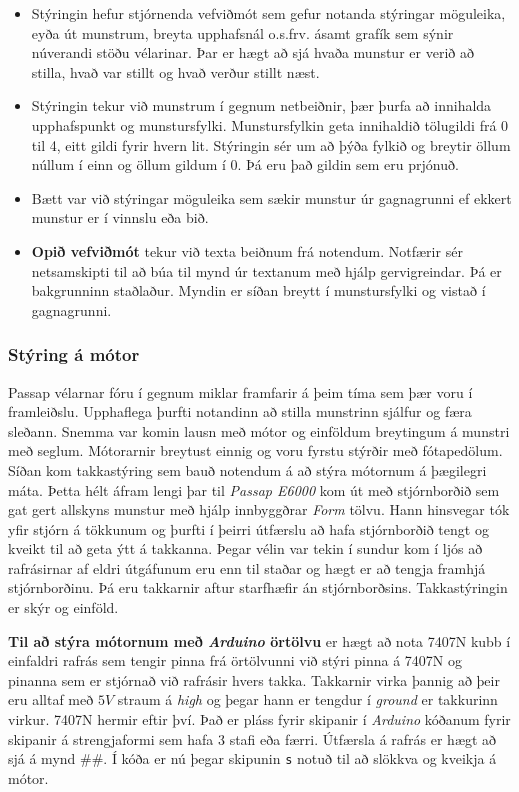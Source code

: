\begin{enumerate}
\begin{itemize}
\begin{enumerate}
        \end{enumerate}
        \item Stýringin hefur stjórnenda vefviðmót sem gefur notanda stýringar möguleika, eyða út munstrum, breyta upphafsnál o.s.frv. ásamt grafík sem sýnir núverandi stöðu vélarinar. Þar er hægt að sjá hvaða munstur er verið að stilla, hvað var stillt og hvað verður stillt næst.
        \item Stýringin tekur við munstrum í gegnum netbeiðnir, þær þurfa að innihalda upphafspunkt og munstursfylki. Munstursfylkin geta innihaldið tölugildi frá 0 til 4, eitt gildi fyrir hvern lit. Stýringin sér um að þýða fylkið og breytir öllum núllum í einn og öllum gildum í 0. Þá eru það gildin sem eru prjónuð.
        \item Bætt var við stýringar möguleika sem sækir munstur úr gagnagrunni ef ekkert munstur er í vinnslu eða bið.
        \item     \textbf{Opið vefviðmót}
    tekur við texta beiðnum frá notendum. Notfærir sér netsamskipti til að búa til mynd úr textanum með hjálp gervigreindar. Þá er bakgrunninn staðlaður. Myndin er síðan breytt í munstursfylki og vistað í gagnagrunni.       
    \end{itemize}
\end{enumerate}
\subsubsection{Stýring á mótor}
Passap vélarnar fóru í gegnum miklar framfarir á þeim tíma sem þær voru í framleiðslu. Upphaflega þurfti notandinn að stilla munstrinn sjálfur og færa sleðann. Snemma var komin lausn með mótor og einföldum breytingum á munstri með seglum. Mótorarnir breytust einnig og voru fyrstu stýrðir með fótapedölum. Síðan kom takkastýring sem bauð notendum á að stýra mótornum á þægilegri máta. Þetta hélt áfram lengi þar til \textit{Passap E6000} kom út með stjórnborðið sem gat gert allskyns munstur með hjálp innbyggðrar \textit{Form} tölvu. Hann hinsvegar tók yfir stjórn á tökkunum og þurfti í þeirri útfærslu að hafa stjórnborðið tengt og kveikt til að geta ýtt á takkanna. Þegar vélin var tekin í sundur kom í ljós að rafrásirnar af eldri útgáfunum eru enn til staðar og hægt er að tengja framhjá stjórnborðinu. Þá eru takkarnir aftur starfhæfir án stjórnborðsins. Takkastýringin er skýr og einföld.

\textbf{Til að stýra mótornum með \textit{Arduino} örtölvu} er hægt að nota 7407N kubb í einfaldri rafrás sem tengir pinna frá örtölvunni við stýri pinna á 7407N og pinanna sem er stjórnað við rafrásir hvers takka. Takkarnir virka þannig að þeir eru alltaf með $5V$ straum á \textit{high} og þegar hann er tengdur í \textit{ground} er takkurinn virkur. 7407N hermir eftir því. Það er pláss fyrir skipanir í \textit{Arduino} kóðanum fyrir skipanir á strengjaformi sem hafa 3 stafi eða færri. 
Útfærsla á rafrás er hægt að sjá á mynd ##. 
Í kóða er nú þegar skipunin \texttt{s} notuð til að slökkva og kveikja á mótor.
